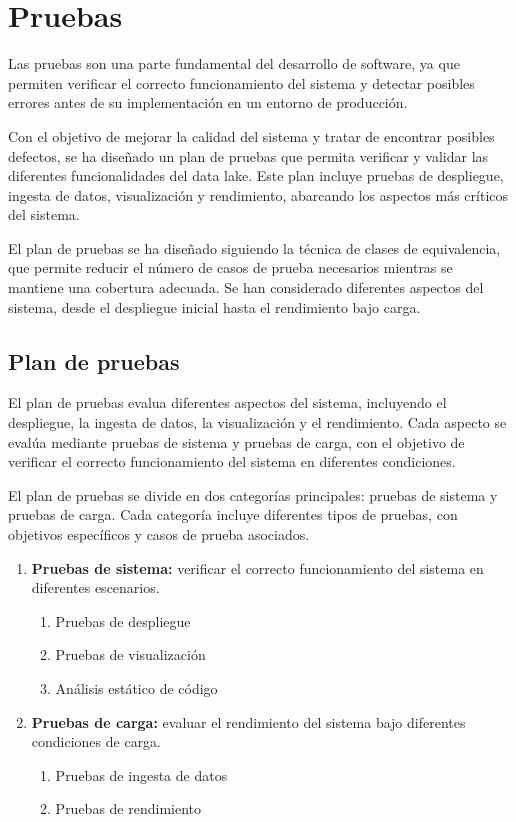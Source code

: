 \chapter{Pruebas}
Las pruebas son una parte fundamental del desarrollo de software, ya que
permiten verificar el correcto funcionamiento del sistema y detectar posibles
errores antes de su implementación en un entorno de producción.

Con el objetivo de mejorar la calidad del sistema y tratar de encontrar posibles
defectos, se ha diseñado un plan de pruebas que permita verificar y
validar las diferentes funcionalidades del data lake. Este plan incluye pruebas
de despliegue, ingesta de datos, visualización y rendimiento, abarcando los
aspectos más críticos del sistema.

El plan de pruebas se ha diseñado siguiendo la técnica de clases de
equivalencia, que permite reducir el número de casos de prueba necesarios
mientras se mantiene una cobertura adecuada. Se han considerado diferentes
aspectos del sistema, desde el despliegue inicial hasta el rendimiento bajo
carga.


\newpage{}
\section{Plan de pruebas}
El plan de pruebas evalua diferentes aspectos del sistema, incluyendo el
despliegue, la ingesta de datos, la visualización y el rendimiento. Cada
aspecto se evalúa mediante pruebas de sistema y pruebas de carga, con el
objetivo de verificar el correcto funcionamiento del sistema en diferentes
condiciones.


El plan de pruebas se divide en dos categorías principales: pruebas de sistema
y pruebas de carga. Cada categoría incluye diferentes tipos de pruebas, con
objetivos específicos y casos de prueba asociados.

\begin{enumerate}
    \item \textbf{Pruebas de sistema:} verificar el correcto funcionamiento
        del sistema en diferentes escenarios. \begin{enumerate}
            \item Pruebas de despliegue
            \item Pruebas de visualización
            \item Análisis estático de código
        \end{enumerate}
    \item \textbf{Pruebas de carga:} evaluar el rendimiento del sistema bajo
        diferentes condiciones de carga. \begin{enumerate}
            \item Pruebas de ingesta de datos
            \item Pruebas de rendimiento
        \end{enumerate}
\end{enumerate}

